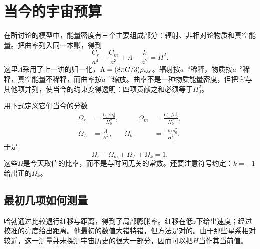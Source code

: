 \section{当今的宇宙预算}

在所讨论的模型中，能量密度有三个主要组成部分：辐射、非相对论物质和真空能量。把曲率列入同一本账，得到
\begin{equation}
\frac{C_r}{a^4}
+\frac{C_m}{a^3}
+\Lambda
-\frac{k}{a^2}
=H^2.
\label{eq:c06-budget}
\end{equation}
这里\(\Lambda\)采用了上一讲的归一化，\(\Lambda=(8\pi G/3)\rho_{\rm vac}\)。辐射按\(a^{-4}\)稀释，物质按\(a^{-3}\)稀释，真空能量不稀释，而曲率按\(a^{-2}\)缩放。曲率不是一种物质能量密度，但把它与其他项并列，使当今的约束变得透明：四项贡献之和必须等于\(H_0^2\)。

用下式定义它们当今的分数
\begin{equation}
\begin{aligned}
\Omega_r&=\frac{C_r/a_0^4}{H_0^2},
&\qquad
\Omega_m&=\frac{C_m/a_0^3}{H_0^2},\\
\Omega_\Lambda&=\frac{\Lambda}{H_0^2},
&
\Omega_k&=\frac{-k/a_0^2}{H_0^2}.
\end{aligned}
\label{eq:c06-omegas}
\end{equation}
于是
\begin{equation}
\boxed{\Omega_r+\Omega_m+\Omega_\Lambda+\Omega_k=1.}
\label{eq:c06-sum-rule}
\end{equation}
这些\(\Omega\)是今天取值的比率，而不是与时间无关的常数。还要注意符号约定：\(k=-1\)给出正的\(\Omega_k\)。

\subsection{最初几项如何测量}

哈勃通过比较退行红移与距离，得到了局部膨胀率。红移在低\(z\)下给出速度；经过校准的亮度给出距离。他最初的数值大错特错，但方法是对的。由于那些星系相对较近，这一测量并未探测宇宙历史的很大一部分，因而可以把\(H\)当作其当前值。

\begin{classroomqa}
\end{classroomqa}

